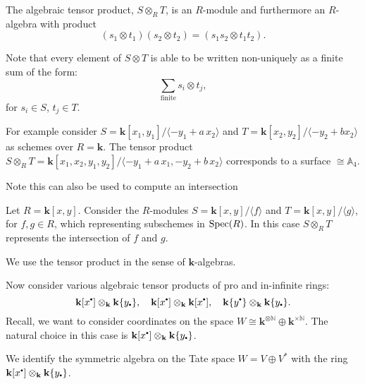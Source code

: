     \begin{defn}
    The algebraic tensor product, \( S \otimes_R T\), is an \(R\)-module and furthermore an \(R\)-algebra
    with product \[ (s_1\otimes t_1)(s_2 \otimes t_2) = (s_1 s_2 \otimes t_1 t_2 ).\]
    \end{defn}

    \begin{rem}Note that every element of \(S \otimes T\) is able to be written non-uniquely as a finite sum of the form:
    \[ \sum_{\text{finite}} s_i \otimes t_j, \]
    for \(s_i \in S\), \(t_j \in T\).
    \end{rem}

    \begin{ex} For example consider \( S = \mathbf{k}[x_1,y_1] / \langle -y_1 + a \,x_2 \rangle \) and \( T = \mathbf{k}[x_2, y_2] / \langle -y_2 + b x_2 \rangle \) as schemes over \( R = \mathbf{k}\). The tensor product \(S \otimes_R T  = \mathbf{k}[x_1, x_2, y_1, y_2] / \langle -y_1 + a \, x_1 , -y_2 + b\, x_2 \rangle \) corresponds to a surface \( \cong \mathbb{A}_4\).
    \end{ex}
    
    Note this can also be used to compute an intersection 
    \begin{ex} Let \(R= \mathbf{k}[x,y]\). Consider the \(R\)-modules \(S = \mathbf{k}[x,y]/\langle f \rangle \) and \(T = \mathbf{k}[x,y]/\langle g\rangle \), for \(f,g \in R\), which representing subschemes in \( \mathrm{Spec}(R)\).  In this case \(S \otimes_R T\) represents the intersection of \(f\) and \(g\).
    \end{ex}
    
    We use the tensor product in the sense of \( \mathbf{k}\)-algebras. 
    
    Now consider various algebraic tensor products of pro and in-infinite rings:
    \[  \mathbf{k}[x^{\sbt}] \otimes_{\mathbf{k}}  \mathbf{k}\{y_{\sbt}\}, \quad \mathbf{k}[x^{\sbt}] \otimes_{\mathbf{k}} \mathbf{k}[ x^{\sbt}] , \quad  \mathbf{k}\{y^{\sbt} \} \otimes_{\mathbf{k}}  \mathbf{k}\{y_{\sbt}\}. \]
    Recall, we want to consider coordinates on the space \(W \cong \mathbf{k}^{\otimes \mathbb{N}} \oplus \mathbf{k}^{\times \mathbb{N}} \). The natural choice in this case is \( \mathbf{k}[x^{\sbt}] \otimes_{\mathbf{k}}  \mathbf{k}\{y_{\sbt}\}\). 
    \begin{lem}
    \label{lem:coordring}
    We identify the symmetric algebra on the Tate space \(W = V \oplus V^{*}\) with the ring \( \mathbf{k}[x^{\sbt}] \otimes_{\mathbf{k}}  \mathbf{k}\{y_{\sbt}\}\). 
    \end{lem}
    
